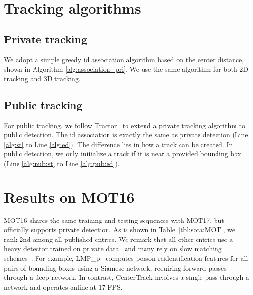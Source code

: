 \documentclass[runningheads]{llncs}
\newcommand{\reftab}[1]{Table~\ref{tbl:#1}}
\begin{document}



\clearpage

\appendix

\section{Tracking algorithms}
\subsection{Private tracking}
We adopt a simple greedy id association algorithm based on the center distance, shown in Algorithm \ref{alg:association_pri}.
We use the same algorithm for both 2D tracking and 3D tracking.

\subsection{Public tracking}

For public tracking, we follow Tractor~\cite{bergmann2019tracking} to extend a private tracking algorithm to public detection. The id association is exactly the same as private detection (Line \ref{alg:st} to Line \ref{alg:ed}). The difference lies in how a track can be created. In public detection, we only initialize a track if it is near a provided bounding box (Line \ref{alg:pub:st} to Line \ref{alg:pub:ed}).

\section{Results on MOT16}
MOT16 shares the same training and testing sequences with MOT17, but officially supports private detection.
As is shown in \reftab{sota:MOT}, we rank 2nd among all published entries.
We remark that all other entries use a heavy detector trained on private data~\cite{yu2016poi} and many rely on slow matching schemes~\cite{tang2017multiple,yu2016poi}.
For example, LMP\_p~\cite{tang2017multiple} computes person-reidentification features for all pairs of bounding boxes using a Siamese network, requiring  forward passes through a deep network. In contrast, CenterTrack involves a single pass through a network and operates online at 17 FPS.
\end{document}
